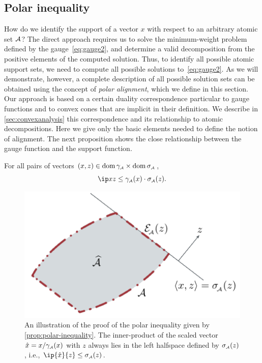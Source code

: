 \subsection{Polar inequality} \label{sec:approach}

How do we identify the support of a vector $x$ with respect to an arbitrary
atomic set $\mathcal{A}$? The direct approach requires us to solve the minimum-weight
problem defined by the gauge~\eqref{eq:gauge2}, and determine a valid decomposition
from the positive elements of the computed solution. Thus, to identify all
possible atomic support sets, we need to compute all possible solutions
to~\eqref{eq:gauge2}. As we will demonstrate, however, a complete description of all
possible solution sets can be obtained using the concept of \emph{polar
alignment}, which we define in this section. Our approach is based on a certain
duality correspondence particular to gauge functions and to convex cones that
are implicit in their definition. We describe in \autoref{sec:convexanalysis} this correspondence and its relationship to atomic decompositions. Here we give only the basic elements needed to define the notion of alignment. The next proposition shows the close relationship between the gauge function and the support function. 

\begin{proposition} \label{prop:polar-inequality}
    For all pairs of vectors $(x,z)\in\operatorname{dom}\gamma_{\scriptscriptstyle\mathcal{A}}\times\operatorname{dom}\sigma_{\scriptscriptstyle\mathcal{A}}$,
    \begin{equation}
      \label{eq:polar-inequality}
      \ip x z \le \gauge\As(x)\cdot\sigma\As(z).
    \end{equation}
\end{proposition}

\begin{figure}[t] 
    \centering
    \includegraphics[page=10]{./figures/illustrations.pdf}
    \caption{%
    An illustration of the proof of the polar
    inequality given by \autoref{prop:polar-inequality}. The inner-product of the scaled vector $\hat x = x/\gamma_{\scriptscriptstyle\mathcal{A}}(x)$ with $z$ always lies in the left halfspace defined by
    $\sigma_{\scriptscriptstyle\mathcal{A}}(z)$, i.e., $\ip{\hat x}{z}\leq\sigma\As(z)$.
    }
    \label{fig:polar-inequality}
\end{figure}


